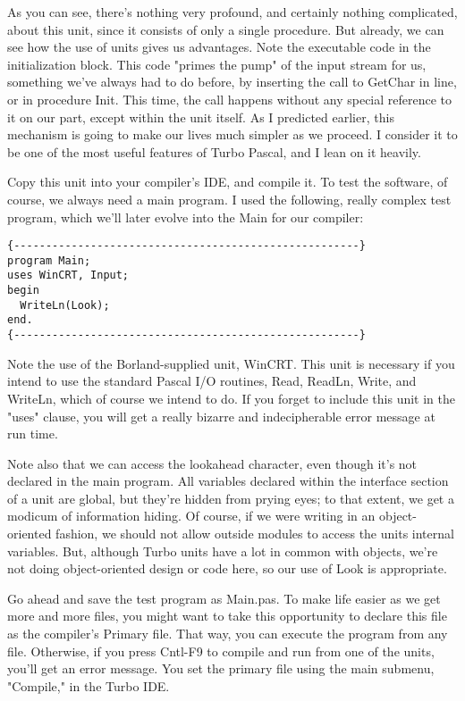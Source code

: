 As you can see, there's nothing very profound, and certainly nothing complicated, about this unit, since it consists of only a single procedure. But already, we can see how the use of units gives us advantages. Note the executable code in the initialization block. This code "primes the pump" of the input stream for us, something we've always had to do before, by inserting the call to GetChar in line, or in procedure Init. This time, the call happens without any special reference to it on our part, except within the unit itself. As I predicted earlier, this mechanism is going to make our lives much simpler as we proceed. I consider it to be one of the most useful features of Turbo Pascal, and I lean on it heavily.

Copy this unit into your compiler's IDE, and compile it. To test the software, of course, we always need a main program. I used the following, really complex test program, which we'll later evolve into the Main for our compiler:

\begin{verbatim}
{------------------------------------------------------}
program Main;
uses WinCRT, Input;
begin
  WriteLn(Look);
end.
{------------------------------------------------------}
\end{verbatim}

Note the use of the Borland-supplied unit, WinCRT. This unit is necessary if you intend to use the standard Pascal I/O routines, Read, ReadLn, Write, and WriteLn, which of course we intend to do. If you forget to include this unit in the "uses" clause, you will get a really bizarre and indecipherable error message at run time.

Note also that we can access the lookahead character, even though it's not declared in the main program. All variables declared within the interface section of a unit are global, but they're hidden from prying eyes; to that extent, we get a modicum of information hiding. Of course, if we were writing in an object- oriented fashion, we should not allow outside modules to access the units internal variables. But, although Turbo units have a lot in common with objects, we're not doing object-oriented design or code here, so our use of Look is appropriate.

Go ahead and save the test program as Main.pas. To make life easier as we get more and more files, you might want to take this opportunity to declare this file as the compiler's Primary file. That way, you can execute the program from any file. Otherwise, if you press Cntl-F9 to compile and run from one of the units, you'll get an error message. You set the primary file using the main submenu, "Compile," in the Turbo IDE.

